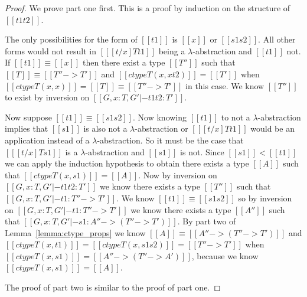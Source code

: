 \begin{proof}
  We prove part one first. This is a proof by induction on the structure of $[[t1 t2]]$.

  The only possibilities for the form of $[[t1]]$ is $[[x]]$ or $[[s1 s2]]$.  All other 
  forms would not result in $[[ [t/x] T t1]]$ being a $\lambda$-abstraction and $[[t1]]$ not.
  If $[[t1]] \equiv [[x]]$ then there exist a type $[[T'']]$ such that $[[T]] \equiv [[T'' -> T']]$ and
  $[[ctype T (x,x t2)]] = [[T']]$ when $[[ctype T (x,x)]] = [[T]] \equiv [[T'' -> T']]$ in this case.  We know
  $[[T'']]$ to exist by inversion on $[[G,x:T,G' |- t1 t2:T']]$.

  Now suppose $[[t1]] \equiv [[s1 s2]]$.  Now knowing $[[t1]]$ to not a $\lambda$-abstraction
  implies that $[[s1]]$ is also not a $\lambda$-abstraction or $[[ [t/x] T t1]]$ would be an application
  instead of a $\lambda$-abstraction.  So it must be the case that $[[ [t/x] T s1]]$ is a $\lambda$-abstraction
  and $[[s1]]$ is not.  Since $[[s1]] < [[t1]]$ we can apply the induction hypothesis to obtain there exists
  a type $[[A]]$ such that $[[ctype T (x,s1)]] = [[A]]$.  
  Now by inversion on $[[G,x:T,G' |- t1 t2:T']]$ we know there exists a type $[[T'']]$ such that
  $[[G,x:T,G' |- t1:T'' -> T']]$.  We know $[[t1]] \equiv [[s1 s2]]$ so by inversion on
  $[[G,x:T,G' |- t1:T'' -> T']]$ we know there exists a type $[[A'']]$ such that
  $[[G,x:T,G' |- s1:A'' -> (T'' -> T')]]$.
  By part two of Lemma~\ref{lemma:ctype_props} we know $[[A]] \equiv [[A'' -> (T'' -> T')]]$ and
  $[[ctype T (x,t1)]] = [[ctype T (x,s1 s2)]] = [[T'' -> T']]$ 
  when $[[ctype T (x,s1)]] = [[A'' -> (T'' -> A')]]$, because we know $[[ctype T (x,s1)]] = [[A]]$.

  \noindent
  The proof of part two is similar to the proof of part one.
\end{proof}

